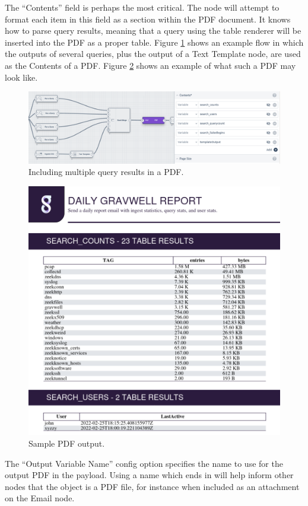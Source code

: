 The ``Contents'' field is perhaps the most critical. The node will attempt to format each item in this field as a section within the PDF document. It knows how to parse query results, meaning that a query using the table renderer will be inserted into the PDF as a proper table. Figure \ref{fig:pdf-contents} shows an example flow in which the outputs of several queries, plus the output of a Text Template node, are used as the Contents of a PDF. Figure \ref{fig:pdf-result} shows an example of what such a PDF may look like.

\begin{figure}
	\includegraphics[width=0.95\linewidth]{images/pdf-contents.png}
	\caption{Including multiple query results in a PDF.}
	\label{fig:pdf-contents}
\end{figure}

\begin{figure}
	\includegraphics[width=0.85\linewidth]{images/pdf-result.png}
	\caption{Sample PDF output.}
	\label{fig:pdf-result}
\end{figure}

The ``Output Variable Name'' config option specifies the name to use for the output PDF in the payload. Using a name which ends in  will help inform other nodes that the object is a PDF file, for instance when included as an attachment on the Email node.

